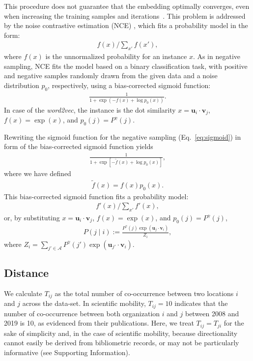 \documentclass[12pt]{article} %
\def\given{\mid}
\def\SI{Supporting Information}
\begin{document}
This procedure does not guarantee that the embedding optimally converges, even when increasing the training samples and iterations~\autocite{Chia2010,Dyer2014}.
This problem is addressed by the noise contrastive estimation (NCE) \autocite{Chia2010}, which fits a probability model in the form:
\begin{align}
	\label{eq:nce}
	f(x) / \sum_{x'} f(x'),
\end{align}
where $f(x)$ is the unnormalized probability for an instance $x$.
As in negative sampling, NCE fits the model based on a binary classification task, with positive and negative samples randomly drawn from the given data and a noise distribution $p_0$, respectively, using a bias-corrected sigmoid function:
\begin{align}
	\label{eq:sigmoid2}
	\frac{1}{1 + \exp\left( -f(x) + \log p_0(x) \right)}.
\end{align}
In case of the {\it word2vec}, the instance is the dot similarity $x=\bm{u}_i \cdot \bm{v}_j$,  $f(x)=\exp(x)$, and $p_0(j)=P^\gamma(j)$.

Rewriting the sigmoid function for the negative sampling (Eq.~\eqref{eq:sigmoid}) in form of the bias-corrected sigmoid function yields
\begin{align}
	\label{eq:sigmoid3}
	\frac{1}{1 + \exp\left[ - \tilde f(x) + \log p_0(x)  \right]},
\end{align}
where we have defined
\begin{align}
	\label{eq:unnormalized}
	\tilde f(x) = f(x) p_0(x).
\end{align}
This bias-corrected sigmoid function fits a probability model:
\begin{align}
	f'(x) / \sum_{x'} f'(x),
\end{align}
or, by substituting $x=\bm{u}_i \cdot \bm{v}_j$, $f(x)=\exp(x)$, and $p_0(j)=P^\gamma (j)$,
\begin{align}
	P\left(j \given i \right):= \frac{P^\gamma (j)\exp(\bm{u}_j \cdot \bm{v}_{i})}{Z_i},
\end{align}
where $Z_i=\sum_{j' \in \mathcal{A}} P^\gamma (j') \exp(\bm{u}_{j'} \cdot \bm{v}_{i})$.


%
%
\subsection*{Distance}
We calculate $T_{ij}$ as the total number of co-occurrence between two locations $i$ and $j$ across the data-set.
In scientific mobility, $T_{ij} = 10$ indicates that the number of co-occurrence between both organization $i$ and $j$ between 2008 and 2019 is 10, as evidenced from their publications.
Here, we treat $T_{ij} = T_{ji}$ for the sake of simplicity and, in the case of scientific mobility, because directionality cannot easily be derived from bibliometric records, or may not be particularly informative (see \SI).
\end{document}
